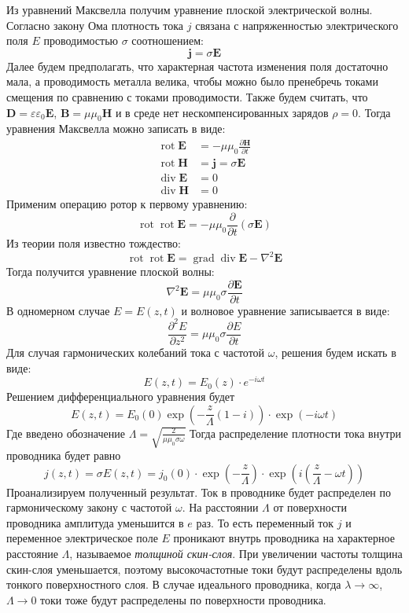 Из уравнений Максвелла получим уравнение плоской электрической волны. Согласно закону Ома плотность тока $j$ связана с напряженностью электрического поля $E$ проводимостью $\sigma$ соотношением:
$$
\pmb{j} = \sigma \pmb {E}
$$
Далее будем предполагать, что характерная частота изменения поля достаточно мала, а проводимость металла велика, чтобы можно было пренебречь токами смещения по сравнению с токами проводимости. Также будем считать, что $\pmb{D} = \varepsilon \varepsilon_0 \pmb{E}$, $\pmb{B} = \mu \mu_0 \pmb{H}$ и в среде нет нескомпенсированных зарядов $\rho = 0$. Тогда уравнения Максвелла можно записать в виде:
\begin{equation*}
	\begin{split}
		\operatorname{rot} \pmb{E} &= -\mu \mu_0 \frac{\partial \pmb{H}}{\partial t} \\
		\operatorname{rot} \pmb{H} &= \pmb{j} = \sigma \pmb{E} \\
		\operatorname{div} \pmb{E} &= 0 \\
		\operatorname{div} \pmb{H} &= 0
	\end{split}
\end{equation*}
Применим операцию ротор к первому уравнению:
$$
\operatorname{rot} \operatorname{rot} \pmb{E} = - \mu \mu_0  \frac{\partial}{\partial t} \left( \sigma \pmb{E} \right)
$$
Из теории поля известно тождество:
$$
\operatorname{rot} \operatorname{rot} \pmb{E} = \operatorname{grad} \operatorname{div} \pmb{E} - \nabla^2 \pmb{E}
$$
Тогда получится уравнение плоской волны:
$$
\nabla^2 \pmb{E} = \mu \mu_0 \sigma \frac{\partial \pmb{E}}{\partial t}
$$
В одномерном случае $E = E(z, t)$ и волновое уравнение записывается в виде:
$$
\frac{\partial^2 E}{\partial z^2} = \mu \mu_0 \sigma \frac{\partial E}{\partial t}
$$
Для случая гармонических колебаний тока с частотой $\omega$, решения будем искать в виде:
$$
E(z, t) = E_0(z) \cdot e^{-i \omega t}
$$
Решением дифференциального уравнения будет
$$
E(z, t) = E_0(0) \exp{ \left( -\frac{z}{\Lambda} (1 - i) \right) }  \cdot \exp{ \left( -i \omega t \right) }
$$
Где введено обозначение $\Lambda = \sqrt{\frac{2}{\mu \mu_0 \sigma \omega}}$
Тогда распределение плотности тока внутри проводника будет равно
$$
j(z, t) = \sigma E(z, t) = j_0(0) \cdot \exp{ \left( -\frac{z}{\Lambda} \right)} \cdot \exp { \left( i \left(\frac{z}{ \Lambda} - \omega t \right) \right) }
$$
Проанализируем полученный результат. Ток в проводнике будет распределен по гармоническому закону с частотой $\omega$. На расстоянии $\Lambda$ от поверхности проводника амплитуда уменьшится в $e$ раз. То есть переменный ток $j$ и переменное электрическое поле $E$ проникают внутрь проводника на характерное расстояние $\Lambda$, называемое \textit{толщиной скин-слоя}. При увеличении частоты толщина скин-слоя уменьшается, поэтому высокочастотные токи будут распределены вдоль тонкого поверхностного слоя. В случае идеального проводника, когда $\lambda \rightarrow \infty$, $\Lambda \rightarrow 0$ токи тоже будут распределены по поверхности проводника.

